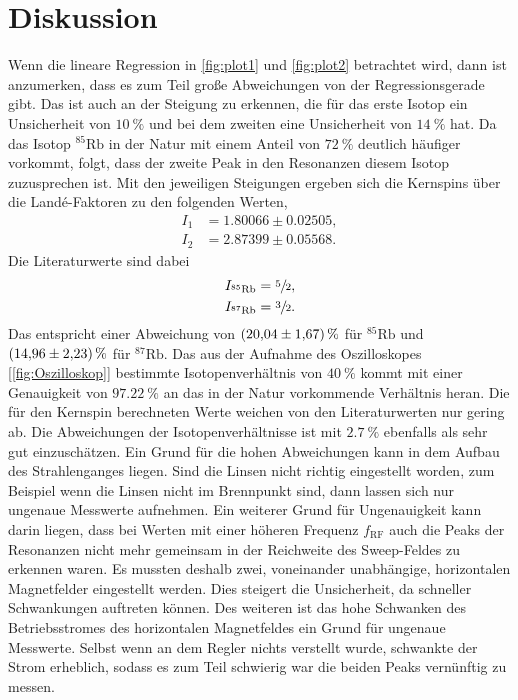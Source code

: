 \section{Diskussion}
\label{sec:Diskussion}

Wenn die lineare Regression in \autoref{fig:plot1} und \autoref{fig:plot2} betrachtet wird, dann ist anzumerken, dass es zum Teil große Abweichungen von der Regressionsgerade gibt.
Das ist auch an der Steigung zu erkennen, die für das erste Isotop ein Unsicherheit von $\SI{10}{\percent}$ und bei dem zweiten eine Unsicherheit von $\SI{14}{\percent}$ hat.
Da das Isotop $^{85}\text{Rb}$ in der Natur mit einem Anteil von $\SI{72}{\percent}$ deutlich häufiger vorkommt, folgt, dass der zweite Peak in den Resonanzen diesem Isotop 
zuzusprechen ist. Mit den jeweiligen Steigungen ergeben sich die Kernspins über die Landé-Faktoren zu den folgenden Werten,
\begin{align*}
    I_1 &= 1.80066 \pm 0.02505, \\
    I_2 &= 2.87399 \pm 0.05568.
\end{align*}
Die Literaturwerte \cite{RubidiumSpin} sind dabei
\begin{align*}
    I_{^{85}\text{Rb}} &= \sfrac52, \\
    I_{^{87}\text{Rb}} &= \sfrac32.
\end{align*}
Das entspricht einer Abweichung von $\SI{20.04\pm 1.67}{\percent}$ für $^{85}\text{Rb}$ und $\SI{14.96\pm 2.23}{\percent}$ für $^{87}\text{Rb}$. 
Das aus der Aufnahme des Oszilloskopes [\ref{fig:Oszilloskop}] bestimmte Isotopenverhältnis von  $\SI{40}{\percent}$ kommt mit einer Genauigkeit von $\SI{97.22}{\percent}$ an das in
der Natur vorkommende Verhältnis heran. \newline
Die für den Kernspin berechneten Werte weichen von den Literaturwerten nur gering ab. Die Abweichungen der Isotopenverhältnisse ist mit $\SI{2.7}{\percent}$ ebenfalls als sehr gut einzuschätzen.
Ein Grund für die hohen Abweichungen kann in dem Aufbau des Strahlenganges liegen. Sind die Linsen nicht richtig eingestellt worden, zum Beispiel wenn die Linsen nicht im Brennpunkt sind, dann
lassen sich nur ungenaue Messwerte aufnehmen.
Ein weiterer Grund für Ungenauigkeit kann darin liegen, dass bei Werten mit einer höheren Frequenz $f_{\text{RF}}$ auch die Peaks der Resonanzen nicht mehr gemeinsam
in der Reichweite des Sweep-Feldes zu erkennen waren. Es mussten deshalb zwei, voneinander unabhängige, horizontalen Magnetfelder eingestellt werden. Dies steigert die Unsicherheit, da
schneller Schwankungen auftreten können.
Des weiteren ist das hohe Schwanken des Betriebsstromes des horizontalen Magnetfeldes ein Grund für ungenaue Messwerte. Selbst wenn an dem Regler nichts verstellt wurde,
schwankte der Strom erheblich, sodass es zum Teil schwierig war die beiden Peaks vernünftig zu messen.